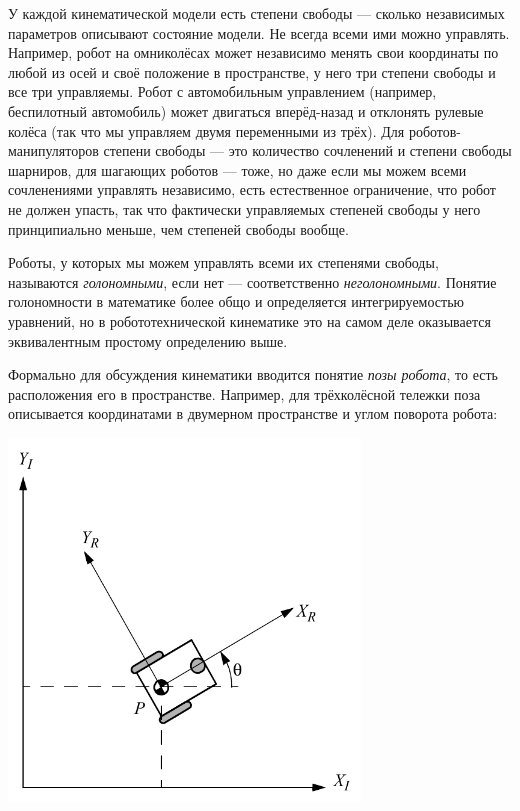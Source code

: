 \documentclass{../../text-style}
\begin{document}
У каждой кинематической модели есть степени свободы --- сколько независимых параметров описывают состояние модели.
Не всегда всеми ими можно управлять.
Например, робот на омниколёсах может независимо менять свои координаты по любой из осей и своё положение в пространстве, у него три степени свободы и все три управляемы.
Робот с автомобильным управлением (например, беспилотный автомобиль) может двигаться вперёд-назад и отклонять рулевые колёса (так что мы управляем двумя переменными из трёх).
Для роботов-манипуляторов степени свободы --- это количество сочленений и степени свободы шарниров, для шагающих роботов --- тоже, но даже если мы можем всеми сочленениями управлять независимо, есть естественное ограничение, что робот не должен упасть, так что фактически управляемых степеней свободы у него принципиально меньше, чем степеней свободы вообще.

Роботы, у которых мы можем управлять всеми их степенями свободы, называются \emph{голономными}, если нет --- соответственно \emph{неголономными}.
Понятие голономности в математике более общо и определяется интегрируемостью уравнений, но в робототехнической кинематике это на самом деле оказывается эквивалентным простому определению выше.

Формально для обсуждения кинематики вводится понятие \emph{позы робота}, то есть расположения его в пространстве.
Например, для трёхколёсной тележки поза описывается координатами в двумерном пространстве и углом поворота робота:

\begin{center}
    \includegraphics[width=0.7\textwidth]{pose.png}
\end{center}
\end{document}
